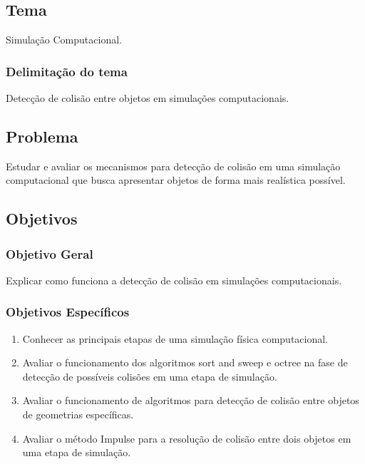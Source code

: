 \chapter*[]{}

\section{Tema}

Simulação Computacional.

\subsection{Delimitação do tema}

Detecção de colisão entre objetos em simulações computacionais.

\section{Problema}

 Estudar e avaliar os mecanismos para detecção de colisão em uma simulação computacional que busca apresentar objetos de forma mais realística possível.


\section{Objetivos}
\subsection{Objetivo Geral}
Explicar como funciona a detecção de colisão em simulações computacionais.

\subsection{Objetivos Específicos}
\begin{enumerate}
\item Conhecer as principais etapas de uma simulação física computacional.
\item Avaliar o funcionamento dos algoritmos sort and sweep e octree na fase de detecção de possíveis colisões em uma etapa de simulação.
\item Avaliar o funcionamento de algoritmos para detecção de colisão entre objetos de geometrias específicas.
\item Avaliar o método Impulse para a resolução de colisão entre dois objetos em uma etapa de simulação.
\end{enumerate}

